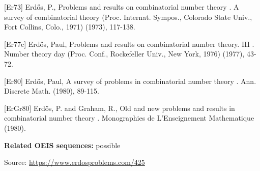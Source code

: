 \documentclass{article}
\begin{document}
[Er73] Erd\H{o}s, P., Problems and results on combinatorial number theory . A survey of combinatorial theory (Proc. Internat. Sympos., Colorado State Univ., Fort Collins, Colo., 1971) (1973), 117-138.

[Er77c] Erd\H{o}s, Paul, Problems and results on combinatorial number theory. III . Number theory day (Proc. Conf., Rockefeller Univ., New York, 1976) (1977), 43-72.

[Er80] Erd\H{o}s, Paul, A survey of problems in combinatorial number theory . Ann. Discrete Math. (1980), 89-115.

[ErGr80] Erd\H{o}s, P. and Graham, R., Old and new problems and results in combinatorial number theory . Monographies de L'Enseignement Mathematique (1980).

\noindent\textbf{Related OEIS sequences:} possible


\bigskip
\noindent\small{Source: \url{https://www.erdosproblems.com/425}}
\end{document}
